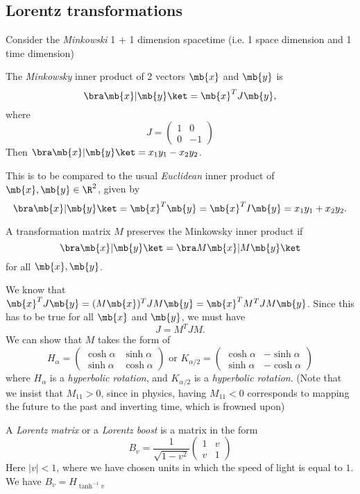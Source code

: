 \documentclass[a4paper]{article}
\begin{document}
\subsection{Lorentz transformations}
Consider the \emph{Minkowski} 1 + 1 dimension spacetime (i.e. 1 space dimension and 1 time dimension)

\begin{defi}
  The \emph{Minkowsky} inner product of 2 vectors $\mb{x}$ and $\mb{y}$ is
  \[
  \bra \mb{x}|\mb{y}\ket = \mb{x}^TJ\mb{y},
  \]
  where
  \[
  J = 
  \begin{pmatrix}
    1 & 0\\
    0 & -1
  \end{pmatrix}
  \]
  Then $\bra \mb{x}|\mb{y}\ket = x_1y_1 - x_2y_2$.
\end{defi}
This is to be compared to the usual \emph{Euclidean} inner product of $\mb{x}, \mb{y}\in \R^2$, given by
\[
\bra \mb{x}|\mb{y}\ket = \mb{x}^T\mb{y} = \mb{x}^TI\mb{y} = x_1y_1 + x_2y_2.
\]

\begin{defi}
  A transformation matrix $M$ preserves the Minkowsky inner product if
  \[
  \bra \mb{x}|\mb{y}\ket = \bra M\mb{x} | M\mb{y}\ket
  \]
  for all $\mb{x}, \mb{y}$.
\end{defi}

We know that $\mb{x}^TJ\mb{y} = (M\mb{x})^TJM\mb{y} = \mb{x}^T M^TJM\mb{y}$. Since this has to be true for all $\mb{x}$ and $\mb{y}$, we must have
\[
J = M^TJM.
\]
We can show that $M$ takes the form of
\[
H_\alpha = \begin{pmatrix}
  \cosh \alpha & \sinh \alpha\\
  \sinh \alpha & \cosh \alpha
\end{pmatrix}\text{ or } K_{\alpha/2} = 
\begin{pmatrix}
  \cosh\alpha & -\sinh\alpha\\
  \sinh\alpha & -\cosh\alpha
\end{pmatrix}
\]
where $H_\alpha$ is a \emph{hyperbolic rotation}, and $K_{\alpha/2}$ is a \emph{hyperbolic rotation}. (Note that we insist that $M_{11} > 0$, since in physics, having $M_{11} < 0$ corresponds to mapping the future to the past and inverting time, which is frowned upon)

\begin{defi}
  A \emph{Lorentz matrix} or a \emph{Lorentz boost} is a matrix in the form 
  \[
  B_v = \frac{1}{\sqrt{1 - v^2}}
  \begin{pmatrix}
    1 & v\\
    v & 1
  \end{pmatrix}
  \]
  Here $|v| < 1$, where we have chosen units in which the speed of light is equal to $1$. We have $B_v = H_{\tanh^{-1}v}$
\end{defi}
\end{document}
